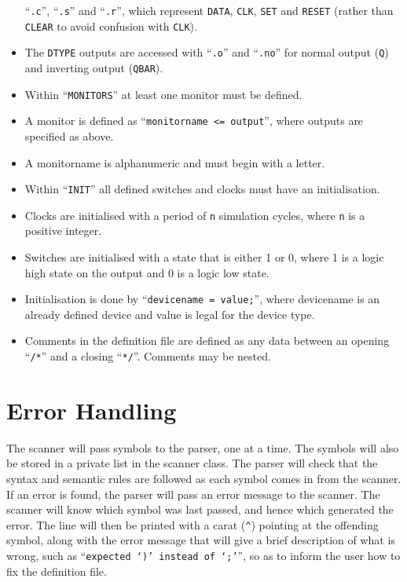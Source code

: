 \documentclass[a4paper,11pt]{article}  %
\begin{document}
\begin{itemize}
    ``\texttt{.c}'', ``\texttt{.s}'' and ``\texttt{.r}'', which
    represent \texttt{DATA}, \texttt{CLK}, \texttt{SET} and
    \texttt{RESET} (rather than \texttt{CLEAR} to avoid confusion with
    \texttt{CLK}).
  \item The \texttt{DTYPE} outputs are accessed with ``\texttt{.o}''
    and ``\texttt{.no}'' for normal output (\texttt{Q}) and inverting
    output (\texttt{QBAR}).
  \item Within ``\texttt{MONITORS}'' at least one monitor must be
    defined.
  \item A monitor is defined as ``\texttt{monitorname <= output}'',
    where outputs are specified as above.
  \item A monitorname is alphanumeric and must begin with a letter.
  \item Within ``\texttt{INIT}'' all defined switches and clocks must
    have an initialisation.
  \item Clocks are initialised with a period of \texttt{n} simulation
    cycles, where \texttt{n} is a positive integer.
  \item Switches are initialised with a state that is either 1 or 0,
    where 1 is a logic high state on the output and 0 is a logic low
    state.
  \item Initialisation is done by ``\texttt{devicename = value;}'', where
    devicename is an already defined device and value is legal for the
    device type.
  \item Comments in the definition file are defined as any data
    between an opening ``\texttt{/*}'' and a closing ``\texttt{*/}''. Comments may be
    nested.
\end{itemize}

\section{Error Handling}

The scanner will pass symbols to the parser, one at a time. The
symbols will also be stored in a private list in the scanner
class. The parser will check that the syntax and semantic rules are
followed as each symbol comes in from the scanner. If an error is
found, the parser will pass an error message to the scanner. The
scanner will know which symbol was last passed, and hence which
generated the error. The line will then be printed with a carat
(\verb+^+) pointing at the offending symbol, along with the error
message that will give a brief description of what is wrong, such as
``\texttt{expected `)' instead of `;'}'', so as to inform the user how
to fix the definition file.
\end{document}
